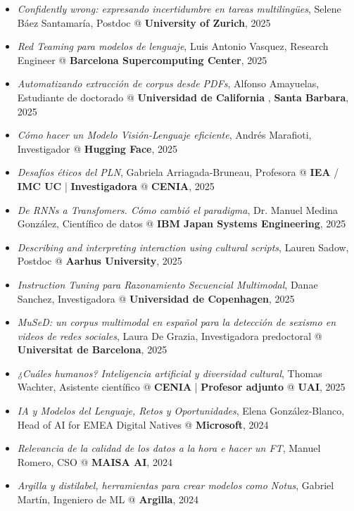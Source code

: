 \begin{itemize}
    \item \textit{Confidently wrong: expresando incertidumbre en tareas multilingües}, Selene Báez Santamaría, Postdoc @ \textbf{University of Zurich}, 2025
    \item \textit{Red Teaming para modelos de lenguaje}, Luis Antonio Vasquez, Research Engineer @ \textbf{Barcelona Supercomputing Center}, 2025
    \item \textit{Automatizando extracción de corpus desde PDFs}, Alfonso Amayuelas, Estudiante de doctorado @ \textbf{Universidad de California} , \textbf{Santa Barbara}, 2025
    \item \textit{Cómo hacer un Modelo Visión-Lenguaje eficiente}, Andrés Marafioti, Investigador @ \textbf{Hugging Face}, 2025
    \item \textit{Desafíos éticos del PLN}, Gabriela Arriagada-Bruneau, Profesora @ \textbf{IEA} / \textbf{IMC UC} | \textbf{Investigadora} @ \textbf{CENIA}, 2025
    \item \textit{De RNNs a Transfomers. Cómo cambió el paradigma}, Dr. Manuel Medina González, Científico de datos @ \textbf{IBM Japan Systems Engineering}, 2025
    \item \textit{Describing and interpreting interaction using cultural scripts}, Lauren Sadow, Postdoc @ \textbf{Aarhus University}, 2025
    \item \textit{Instruction Tuning para Razonamiento Secuencial Multimodal}, Danae Sanchez, Investigadora @ \textbf{Universidad de Copenhagen}, 2025
    \item \textit{MuSeD: un corpus multimodal en español para la detección de sexismo en videos de redes sociales}, Laura De Grazia, Investigadora predoctoral @ \textbf{Universitat de Barcelona}, 2025
    \item \textit{¿Cuáles humanos? Inteligencia artificial y diversidad cultural}, Thomas Wachter, Asistente científico @ \textbf{CENIA} | \textbf{Profesor adjunto} @ \textbf{UAI}, 2025
    \item \textit{IA y Modelos del Lenguaje, Retos y Oportunidades}, Elena González-Blanco, Head of AI for EMEA Digital Natives @ \textbf{Microsoft}, 2024
    \item \textit{Relevancia de la calidad de los datos a la hora e hacer un FT}, Manuel Romero, CSO @ \textbf{MAISA AI}, 2024
    \item \textit{Argilla y distilabel, herramientas para crear modelos como Notus}, Gabriel Martín, Ingeniero de ML @ \textbf{Argilla}, 2024

\end{itemize}
